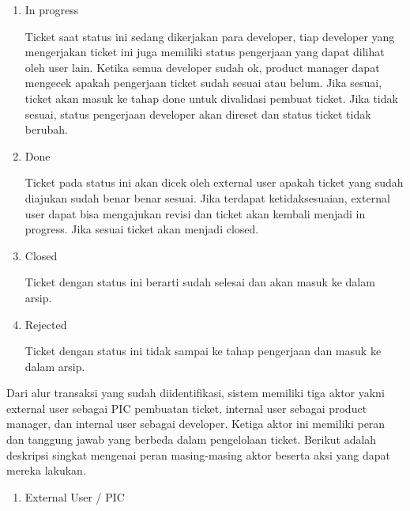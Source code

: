 \documentclass[12pt]{article}
\begin{document}
\begin{enumerate}[label=\textbf{4.\arabic*.}]
\begin{enumerate}[label=\textbf{4.1.\arabic*.}]
\begin{enumerate}[label=\arabic*.]
            \item In progress
            
            Ticket saat status ini sedang dikerjakan para developer, tiap developer yang mengerjakan ticket ini juga memiliki status pengerjaan yang dapat dilihat oleh user lain. Ketika semua developer sudah ok, product manager dapat mengecek apakah pengerjaan ticket sudah sesuai atau belum. Jika sesuai, ticket akan masuk ke tahap done untuk divalidasi pembuat ticket. Jika tidak sesuai, status pengerjaan developer akan direset dan status ticket tidak berubah.
            
            \item Done
            
            Ticket pada status ini akan dicek oleh external user apakah ticket yang sudah diajukan sudah benar benar sesuai. Jika terdapat ketidaksesuaian, external user dapat bisa mengajukan revisi dan ticket akan kembali menjadi in progress. Jika sesuai ticket akan menjadi closed.
            
            \item Closed
            
            Ticket dengan status ini berarti sudah selesai dan akan masuk ke dalam arsip.
            
            \item Rejected
            
            Ticket dengan status ini tidak sampai ke tahap pengerjaan dan masuk ke dalam arsip.
        \end{enumerate}

        Dari alur transaksi yang sudah diidentifikasi, sistem memiliki tiga aktor yakni external user sebagai PIC pembuatan ticket, internal user sebagai product manager, dan internal user sebagai developer. Ketiga aktor ini memiliki peran dan tanggung jawab yang berbeda dalam pengelolaan ticket. Berikut adalah deskripsi singkat mengenai peran masing-masing aktor beserta aksi yang dapat mereka lakukan.

        \begin{enumerate}[label=\arabic*.]
            \item External User / PIC
            

\end{enumerate}
\end{enumerate}
\end{enumerate}
\end{document}
